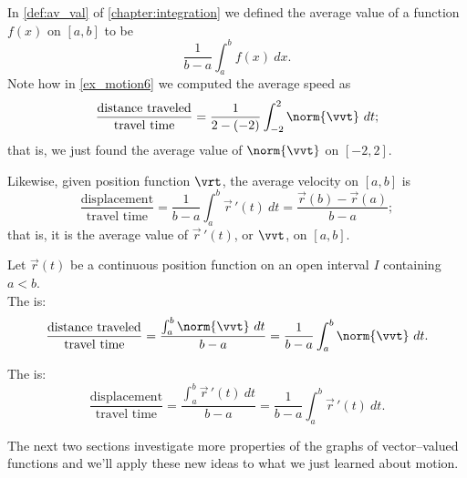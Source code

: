 In \autoref{def:av_val} of \autoref{chapter:integration} we defined the average value of a function $f(x)$ on $[a,b]$ to be
\[\frac{1}{b-a}\int_a^bf(x)\ dx.\]
Note how in \autoref{ex_motion6} we computed the average speed as
\[\frac{\text{distance traveled}}{\text{travel time}} = \frac1{2-(-2)}\int_{-2}^2\norm{\vvt}\ dt;\]
that is, we just found the average value of $\norm{\vvt}$ on $[-2,2]$.

Likewise, given position function $\vrt$, the average velocity on $[a,b]$ is
\[\frac{\text{displacement}}{\text{travel time}} = \frac1{b-a}\int_a^b \vec{r}\,'(t)\ dt = \frac{\vec r(b)-\vec r(a)}{b-a};\]
that is, it is the average value of $\vec r\,'(t)$, or $\vvt$, on $[a,b]$.\\

{Let $\vec r(t)$ be a continuous position function on an open interval $I$ containing $a<b$. \\

The  is:
\[\frac{\text{distance traveled}}{\text{travel time}} = \frac{\int_a^b \norm{\vvt}\ dt}{b-a} = \frac1{b-a}\int_a^b\norm{\vvt}\ dt.\]

The  is:
\[\frac{\text{displacement}}{\text{travel time}} = \frac{\int_a^b \vec{r}\,'(t)\ dt}{b-a} = \frac1{b-a}\int_a^b\vec{r}\,'(t)\ dt.\]}

The next two sections investigate more properties of the graphs of vector--valued functions and we'll apply these new ideas to what we just learned about motion.

